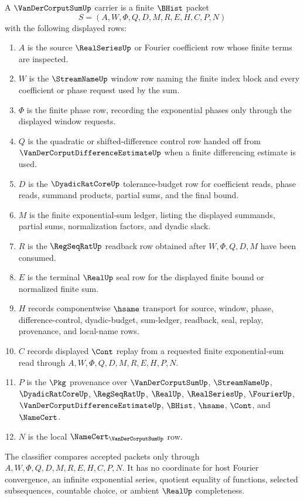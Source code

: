 \begin{definition}
\label{def:van-der-corput-sum-carrier}
A $\VanDerCorputSumUp$ carrier is a finite $\BHist$ packet
$$
S=(A,W,\Phi,Q,D,M,R,E,H,C,P,N)
$$
with the following displayed rows:
\begin{enumerate}
\item $A$ is the source $\RealSeriesUp$ or Fourier coefficient row whose finite terms are inspected.
\item $W$ is the $\StreamNameUp$ window row naming the finite index block and every coefficient or phase request used by the sum.
\item $\Phi$ is the finite phase row, recording the exponential phases only through the displayed window requests.
\item $Q$ is the quadratic or shifted-difference control row handed off from $\VanDerCorputDifferenceEstimateUp$ when a finite differencing estimate is used.
\item $D$ is the $\DyadicRatCoreUp$ tolerance-budget row for coefficient reads, phase reads, summand products, partial sums, and the final bound.
\item $M$ is the finite exponential-sum ledger, listing the displayed summands, partial sums, normalization factors, and dyadic slack.
\item $R$ is the $\RegSeqRatUp$ readback row obtained after $W,\Phi,Q,D,M$ have been consumed.
\item $E$ is the terminal $\RealUp$ seal row for the displayed finite bound or normalized finite sum.
\item $H$ records componentwise $\hsame$ transport for source, window, phase, difference-control, dyadic-budget, sum-ledger, readback, seal, replay, provenance, and local-name rows.
\item $C$ records displayed $\Cont$ replay from a requested finite exponential-sum read through $A,W,\Phi,Q,D,M,R,E,H,P,N$.
\item $P$ is the $\Pkg$ provenance over $\VanDerCorputSumUp$, $\StreamNameUp$, $\DyadicRatCoreUp$, $\RegSeqRatUp$, $\RealUp$, $\RealSeriesUp$, $\FourierUp$, $\VanDerCorputDifferenceEstimateUp$, $\BHist$, $\hsame$, $\Cont$, and $\NameCert$.
\item $N$ is the local $\NameCert_{\VanDerCorputSumUp}$ row.
\end{enumerate}
The classifier compares accepted packets only through $A,W,\Phi,Q,D,M,R,E,H,C,P,N$. It has no coordinate for host Fourier convergence, an infinite exponential series, quotient equality of functions, selected subsequences, countable choice, or ambient $\RealUp$ completeness.
\end{definition}

